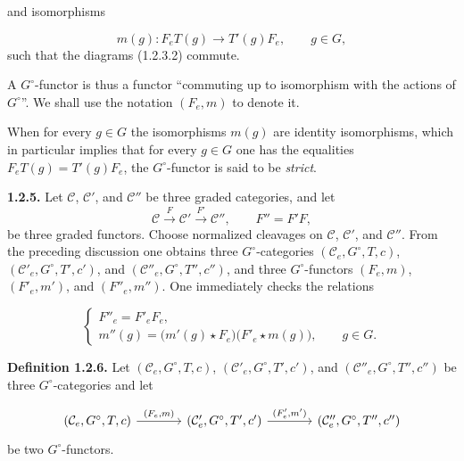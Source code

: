 %
and isomorphisms

\[
  m(g)\colon F_eT(g)\longrightarrow T'(g)F_e,
  \qquad g\in G,
\]
such that the diagrams (1.2.3.2) commute.

A $G^\circ$-functor is thus a functor “commuting up to isomorphism
with the actions of $G^\circ$”. We shall use the notation $(F_e,m)$
to denote it.

When for every $g\in G$ the isomorphisms $m(g)$ are identity
isomorphisms, which in particular implies that for every $g\in G$ one
has the equalities $F_eT(g)=T'(g)F_e$, the $G^\circ$-functor is said to
be \emph{strict}.

\noindent\textbf{1.2.5.}\quad
Let $\mathcal C$, $\mathcal C'$, and $\mathcal C''$ be three graded
categories, and let
\[
  \mathcal C\xrightarrow{F}\mathcal C'
  \xrightarrow{F'}\mathcal C'',\qquad F''=F'F,
\]
be three graded functors. Choose normalized cleavages on $\mathcal C$,
$\mathcal C'$, and $\mathcal C''$. From the preceding discussion one
obtains three $G^\circ$-categories
$(\mathcal C_e,G^\circ,T,c)$,
$(\mathcal C'_e,G^\circ,T',c')$, and
$(\mathcal C''_e,G^\circ,T'',c'')$, and three $G^\circ$-functors
$(F_e,m)$, $(F'_e,m')$, and $(F''_e,m'')$. One immediately checks the
relations

\begin{equation}
  \begin{cases}
    F''_e=F'_eF_e,\\[0.5em]
    m''(g)=\bigl(m'(g)\star F_e\bigr)
      \bigl(F'_e\star m(g)\bigr),\qquad g\in G.
  \end{cases}
  \tag{1.2.5.1}
\end{equation}

\noindent\textbf{Definition 1.2.6.}\quad
Let $(\mathcal C_e,G^\circ,T,c)$,
$(\mathcal C'_e,G^\circ,T',c')$, and
$(\mathcal C''_e,G^\circ,T'',c'')$ be three $G^\circ$-categories and
let

\[
\begin{tikzcd}[column sep=large]
(\mathcal C_e,G^\circ,T,c)
  \arrow[r,"{(F_e,m)}"]
&
(\mathcal C'_e,G^\circ,T',c')
  \arrow[r,"{(F_e^{\prime},m^{\prime})}"]
&
(\mathcal C''_e,G^\circ,T'',c'')
\end{tikzcd}
\]
be two $G^\circ$-functors.

